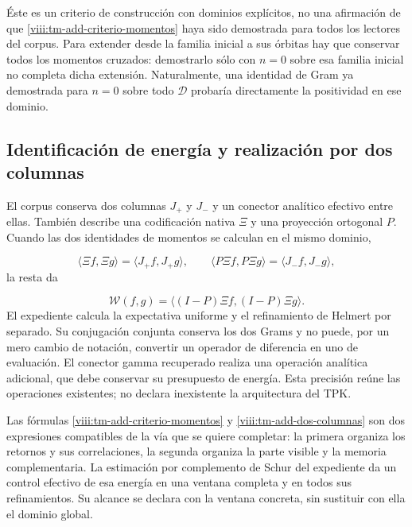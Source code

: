 Éste es un criterio de construcción con dominios explícitos, no una afirmación de que \eqref{viii:tm-add-criterio-momentos} haya sido demostrada para todos los lectores del corpus. Para extender desde la familia inicial a sus órbitas hay que conservar todos los momentos cruzados: demostrarlo sólo con \(n=0\) sobre esa familia inicial no completa dicha extensión. Naturalmente, una identidad de Gram ya demostrada para \(n=0\) sobre todo \(\mathcal D\) probaría directamente la positividad en ese dominio.


\subsection{Identificación de energía y realización por dos columnas}
\label{viii:tm-add-c6}
El corpus conserva dos columnas \(J_+\) y \(J_-\) y un conector analítico efectivo entre ellas. También describe una codificación nativa \(\Xi\) y una proyección ortogonal \(P\). Cuando las dos identidades de momentos se calculan en el mismo dominio,

\[
\langle\Xi f,\Xi g\rangle=\langle J_+f,J_+g\rangle,
\qquad
\langle P\Xi f,P\Xi g\rangle=\langle J_-f,J_-g\rangle,
\]
la resta da

\begin{equation}
\mathscr W(f,g)=\langle(I-P)\Xi f,(I-P)\Xi g\rangle.
\label{viii:tm-add-dos-columnas}
\end{equation}
El expediente calcula la expectativa uniforme y el refinamiento de Helmert por separado. Su conjugación conjunta conserva los dos Grams y no puede, por un mero cambio de notación, convertir un operador de diferencia en uno de evaluación. El conector gamma recuperado realiza una operación analítica adicional, que debe conservar su presupuesto de energía. Esta precisión reúne las operaciones existentes; no declara inexistente la arquitectura del TPK.

Las fórmulas \eqref{viii:tm-add-criterio-momentos} y \eqref{viii:tm-add-dos-columnas} son dos expresiones compatibles de la vía que se quiere completar: la primera organiza los retornos y sus correlaciones, la segunda organiza la parte visible y la memoria complementaria. La estimación por complemento de Schur del expediente da un control efectivo de esa energía en una ventana completa y en todos sus refinamientos. Su alcance se declara con la ventana concreta, sin sustituir con ella el dominio global.


